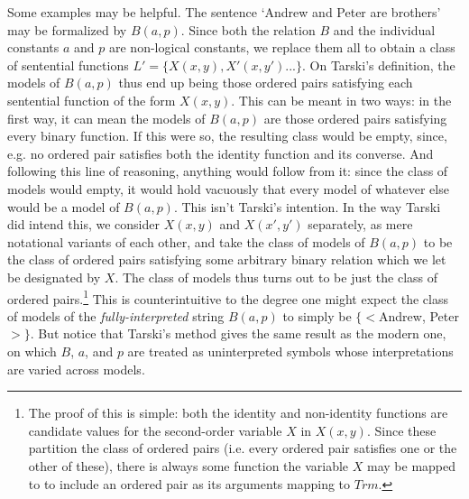 \documentclass[]{article}
\begin{document}
Some examples may be helpful. The sentence `Andrew and Peter are brothers' may be formalized by $B(a, p)$. Since both the relation $B$ and the individual constants $a$ and $p$ are non-logical constants, we replace them all to obtain a class of sentential functions $L' = \{X(x, y), X'(x, y')...\}$. On Tarski's definition, the models of $B(a, p)$ thus end up being those ordered pairs satisfying each sentential function of the form $X(x, y)$. This can be meant in two ways: in the first way, it can mean the models of $B(a, p)$ are those ordered pairs satisfying every binary function. If this were so, the resulting class would be empty, since, e.g. no ordered pair satisfies both the identity function and its converse. And following this line of reasoning, anything would follow from it: since the class of models would empty, it would hold vacuously that every model of whatever else would be a model of $B(a, p)$. This isn't Tarski's intention. In the way Tarski did intend this, we consider $X(x, y)$ and $X(x', y')$ separately, as mere notational variants of each other, and take the class of models of $B(a, p)$ to be the class of ordered pairs satisfying some arbitrary binary relation which we let be designated by $X$. The class of models thus turns out to be just the class of ordered pairs.\footnote{The proof of this is simple: both the identity and non-identity functions are candidate values for the second-order variable $X$ in $X(x, y)$. Since these partition the class of ordered pairs (i.e. every ordered pair satisfies one or the other of these), there is always some function the variable $X$ may be mapped to to include an ordered pair as its arguments mapping to $Trm$.} This is counterintuitive to the degree one might expect the class of models of the \textit{fully-interpreted} string $B(a, p)$ to simply be $\{<$Andrew, Peter$>\}$. But notice that Tarski's method gives the same result as the modern one, on which $B$, $a$, and $p$ are treated as uninterpreted symbols whose interpretations are varied across models.
\end{document}
